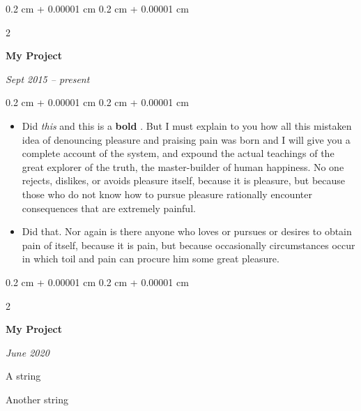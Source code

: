\documentclass[10pt, letterpaper]{article}
\newenvironment{summary}{
    \begin{description}[
        topsep=0.10 cm,
        parsep=0.10 cm,
        partopsep=0pt,
        itemsep=0pt,
        leftmargin=0.4 cm + 10pt
    ]
}{
    \end{description}
} %
\newenvironment{highlights}{
    \begin{itemize}[
        topsep=0.10 cm,
        parsep=0.10 cm,
        partopsep=0pt,
        itemsep=0pt,
        leftmargin=0.4 cm + 10pt
    ]
}{
    \end{itemize}
} %
\newenvironment{onecolentry}{
    \begin{adjustwidth}{
        0.2 cm + 0.00001 cm
    }{
        0.2 cm + 0.00001 cm
    }
}{
    \end{adjustwidth}
} %
\newenvironment{twocolentry}[2][]{
    \onecolentry
    \def\secondColumn{#2}
    \setcolumnwidth{\fill, 4.5 cm}
    \begin{paracol}{2}
}{
    \switchcolumn \raggedleft \secondColumn
    \end{paracol}
    \endonecolentry
} %
\let\hrefWithoutArrow\href
\renewcommand{\href}[2]{\hrefWithoutArrow{#1}{\ifthenelse{\equal{#2}{}}{ }{#2 }\raisebox{.15ex}{\footnotesize \faExternalLink*}}}
\begin{document}
        \vspace{0.2 cm}

        \begin{twocolentry}{
            
            
        \textit{Sept 2015 – present}}
            \textbf{My Project}
        \end{twocolentry}
        \vspace{0.10 cm}
        \begin{onecolentry}
            \begin{highlights}
                \item Did \textit{this} and this is a \textbf{bold} \href{https://example.com}{link}. But I must explain to you how all this mistaken idea of denouncing pleasure and praising pain was born and I will give you a complete account of the system, and expound the actual teachings of the great explorer of the truth, the master-builder of human happiness. No one rejects, dislikes, or avoids pleasure itself, because it is pleasure, but because those who do not know how to pursue pleasure rationally encounter consequences that are extremely painful.
                \item Did that. Nor again is there anyone who loves or pursues or desires to obtain pain of itself, because it is pain, but because occasionally circumstances occur in which toil and pain can procure him some great pleasure.
            \end{highlights}
        \end{onecolentry}


        \vspace{0.2 cm}

        \begin{twocolentry}{
            
            
        \textit{June 2020}}
            \textbf{My Project}
        \end{twocolentry}
            \begin{summary}
                \item A string
                \item Another string
            \end{summary}


        \vspace{0.2 cm}
\end{document}
